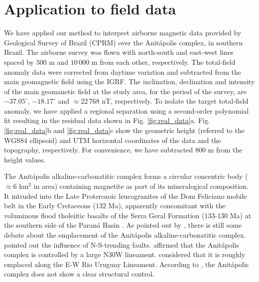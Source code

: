 \section{Application to field data}

We have applied our method to interpret airborne magnetic data provided by 
Geological Survey of Brazil (CPRM) over the Anit{\'a}polis complex, 
in southern Brazil. 
The airborne survey was flown with north-south and east-west lines spaced by $500$ m and $10\,000$ m from each other, respectively. 
The total-field anomaly data were corrected from daytime variation and 
subtracted from the main geomagnetic field using the IGRF. 
The inclination, declination and intensity of the main geomanetic field at the study area, 
for the period of the survey, are $-37.05^{\circ}$, $-18.17^{\circ}$ and 
$\approx 22 \, 768 $ nT, respectively.
To isolate the target total-field anomaly, we have applied 
a regional separation using a second-order polynomial fit resulting in the residual data 
shown in Fig. \ref{fig:real_data}a. 
Fig. \ref{fig:real_data}b and \ref{fig:real_data}c show the geometric height
(referred to the WGS84 ellipsoid) and UTM horizontal coordinates of the data and the 
topography, respectively. For convenience, we have subtracted $ 800 $ m from the height 
values.

The Anit{\'a}polis alkaline-carbonatitic complex forms a circular concentric body 
($\approx 6$ km$^{2}$ in area) containing magnetite as part of its mineralogical 
composition. It intruded into the Late Proterozoic leucogranites of the Dom Feliciano 
mobile belt in the Early Cretaceous ($132$ Ma), apparently concomitant with the 
voluminous flood tholeiitic basalts of the Serra Geral Formation ($133$-$130$ Ma) 
at the southern side of the Paran{\'a} Basin \citep{gibson-1999, scheibe-etal2005}.
As pointed out by \citet{GOMES2018}, there is still some debate about the emplacement 
of the Anit{\'a}polis alkaline-carbonatitic complex. 
\citet{melcher-coutinho1966} pointed out the influence of N-S-trending faults.
\citet{horbach-marimon1980} affirmed that the Anit{\'a}polis complex is controlled by 
a large N30W lineament. 
\citet{scheibe-etal2005} considered that it is roughly emplaced along the E-W Rio 
Uruguay Lineament. According to \citet{riccomini-etal2005}, the Anit{\'a}polis 
complex does not show a clear structural control. 

